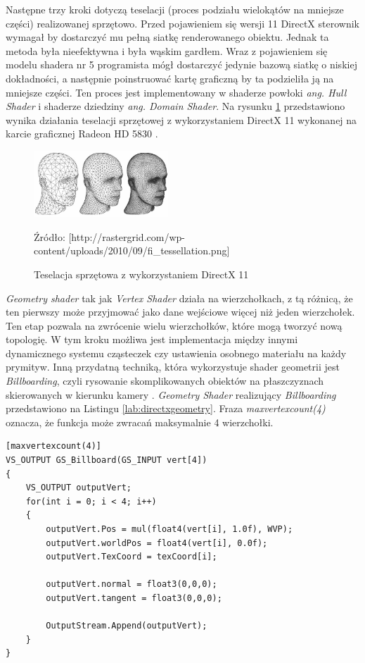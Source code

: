 \documentclass[archive]{mgr}
\begin{document}
\newpage


Następne trzy kroki dotyczą teselacji (proces podziału wielokątów na mniejsze części) realizowanej sprzętowo. Przed pojawieniem się wersji 11 DirectX sterownik wymagał by dostarczyć mu pełną siatkę renderowanego obiektu. Jednak ta metoda była nieefektywna i była wąskim gardłem. Wraz z pojawieniem się modelu shadera nr 5 programista mógł dostarczyć jedynie bazową siatkę o niskiej dokładności, a następnie poinstruować kartę graficzną by ta podzieliła ją na mniejsze części. Ten proces jest implementowany w shaderze powłoki \emph{ang. Hull Shader} i shaderze dziedziny \emph{ang. Domain Shader}. Na rysunku \ref{lab:directxtesselation} przedstawiono wynika działania teselacji sprzętowej z wykorzystaniem DirectX 11 wykonanej na karcie graficznej Radeon HD 5830 \cite{DirectXTesselation}.

\begin{figure}[h!]
  \centering
    \includegraphics[width=0.45\textwidth]{images/tesselation.jpg}
   \caption{Teselacja sprzętowa z wykorzystaniem DirectX 11}
   Źródło: [http://rastergrid.com/wp-content/uploads/2010/09/fi\_tessellation.png]
   \label{lab:directxtesselation}
\end{figure}

\emph{Geometry shader} tak jak \emph{Vertex Shader} działa na wierzchołkach, z tą różnicą, że ten pierwszy może przyjmować jako dane wejściowe więcej niż jeden wierzchołek. Ten etap pozwala na zwrócenie wielu wierzchołków, które mogą tworzyć nową topologię. W tym kroku możliwa jest implementacja między innymi dynamicznego systemu cząsteczek czy ustawienia osobnego materiału na każdy prymityw. Inną przydatną techniką, która wykorzystuje shader geometrii jest \emph{Billboarding}, czyli rysowanie skomplikowanych obiektów na płaszczyznach skierowanych w kierunku kamery \cite{Billboarding}. \emph{Geometry Shader} realizujący \emph{Billboarding} przedstawiono na Listingu \ref{lab:directxgeometry}. Fraza \emph{maxvertexcount(4)} oznacza, że funkcja może zwracań maksymalnie 4 wierzchołki.

\begin{lstlisting}[caption={DirectX, Geometry Shader},captionpos=b,label={lab:directxgeometry}]
[maxvertexcount(4)]
VS_OUTPUT GS_Billboard(GS_INPUT vert[4])
{
	VS_OUTPUT outputVert;
	for(int i = 0; i < 4; i++)
	{	
		outputVert.Pos = mul(float4(vert[i], 1.0f), WVP);
		outputVert.worldPos = float4(vert[i], 0.0f);
		outputVert.TexCoord = texCoord[i];

		outputVert.normal = float3(0,0,0);
		outputVert.tangent = float3(0,0,0);

		OutputStream.Append(outputVert);
	}
}
\end{lstlisting}
\newpage
\end{document}
